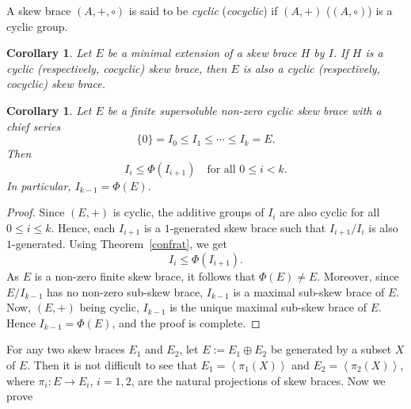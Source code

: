 \documentclass[11pt]{amsart}
\theoremstyle{thrm}
\theoremstyle{plain}
\newtheorem{cor}[thm]{Corollary}
\theoremstyle{definition}
\newcommand{\gen}[1]{\left < #1 \right >}
\numberwithin{equation}{section}
\begin{document}
A skew brace $(A, +, \circ)$ is said to be {\it cyclic} ({\it cocyclic}) if $(A, +)$ ($(A, \circ)$) is a cyclic group.
\begin{cor}
Let $E$ be a minimal extension of a skew brace $H$ by $I$. If $H$ is a cyclic (respectively, cocyclic) skew brace, then $E$ is also a cyclic (respectively, cocyclic) skew brace.
\end{cor}



\begin{cor}
	Let $E$ be a finite supersoluble  non-zero cyclic skew brace with a chief series
	\[
	\{0\} = I_0 \leq I_1 \leq \cdots \leq I_k = E.
	\] 
 Then
	\[
	I_i \leq \Phi(I_{i+1}) \quad \text{for all } 0 \leq i < k.
	\] 
	In particular, $I_{k-1} = \Phi(E)$.
\end{cor}



\begin{proof}
	Since $(E, +)$ is cyclic, the additive groups of $I_i$ are also cyclic for all $0 \leq i \leq k$. 
	Hence, each $I_{i+1}$ is a $1$-generated skew brace such that $I_{i+1}/I_i$ is also $1$-generated. 
	Using Theorem~\ref{confrat}, we  get
	\[
	I_i \leq \Phi(I_{i+1}).
	\] 
As $E$ is a non-zero finite  skew brace, it follows that $\Phi(E) \neq E$.  Moreover, since $E/I_{k-1}$ has no non-zero sub-skew brace,  $I_{k-1}$ is a maximal sub-skew brace of $E$. Now, $(E,+)$ being cyclic, $I_{k-1}$ is the unique  maximal sub-skew brace of $E$. Hence $I_{k-1} = \Phi(E)$, and the proof is complete.	 
\end{proof}

 For any two skew  braces $E_1$ and $E_2$, let $E:=E_1 \oplus E_2$ be generated by a subset $X$ of $E$. Then it is not difficult to see that $E_1 = \gen{\pi_1(X)}$ and $E_2 = \gen{\pi_2(X)}$, where $\pi_i :  E \to E_i$, $i = 1, 2$, are the natural projections of skew braces.  Now we prove
\end{document}
